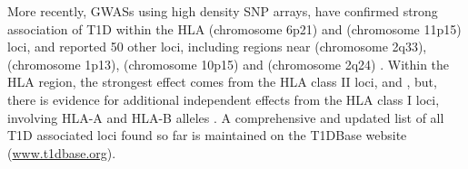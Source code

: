More recently, \Glspl{GWAS} using high density \gls{SNP} arrays,
have confirmed strong association of T1D within the \gls{HLA} (chromosome 6p21) and  (chromosome 11p15) loci,
and reported 50 other loci, including regions near
 (chromosome 2q33),  (chromosome 1p13),  (chromosome 10p15)
and  (chromosome 2q24) \citep{Smyth:2006ce,Nejentsev:2007dv,Burton:2007hta,Barrett:2009jq}.
Within the HLA region, the strongest effect comes from the HLA class II loci,  and ,
but, there is evidence for additional independent effects from the HLA class I loci,
involving HLA-A and HLA-B alleles \citep{Nejentsev:2007dv,Howson:2009bl}. 
A comprehensive and updated list of all T1D associated loci found so far is maintained on the T1DBase website (\url{www.t1dbase.org}).







